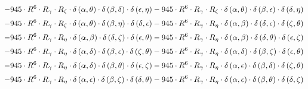 \begin{subequations}
\begin{gather}
 \\[0.2em] \notag 		 - 945 \cdot R^{6} \cdot R_{\gamma{}} \cdot R_{\zeta{}} \cdot \delta{}\left(\alpha{}, \theta{}\right) \cdot \delta{}\left(\beta{}, \delta{}\right) \cdot \delta{}\left(\epsilon{}, \eta{}\right)- 945 \cdot R^{6} \cdot R_{\gamma{}} \cdot R_{\zeta{}} \cdot \delta{}\left(\alpha{}, \theta{}\right) \cdot \delta{}\left(\beta{}, \epsilon{}\right) \cdot \delta{}\left(\delta{}, \eta{}\right) 
 \\[0.2em] \notag 		 - 945 \cdot R^{6} \cdot R_{\gamma{}} \cdot R_{\zeta{}} \cdot \delta{}\left(\alpha{}, \theta{}\right) \cdot \delta{}\left(\beta{}, \eta{}\right) \cdot \delta{}\left(\delta{}, \epsilon{}\right)- 945 \cdot R^{6} \cdot R_{\gamma{}} \cdot R_{\eta{}} \cdot \delta{}\left(\alpha{}, \beta{}\right) \cdot \delta{}\left(\delta{}, \epsilon{}\right) \cdot \delta{}\left(\zeta{}, \theta{}\right) 
 \\[0.2em] \notag 		 - 945 \cdot R^{6} \cdot R_{\gamma{}} \cdot R_{\eta{}} \cdot \delta{}\left(\alpha{}, \beta{}\right) \cdot \delta{}\left(\delta{}, \zeta{}\right) \cdot \delta{}\left(\epsilon{}, \theta{}\right)- 945 \cdot R^{6} \cdot R_{\gamma{}} \cdot R_{\eta{}} \cdot \delta{}\left(\alpha{}, \beta{}\right) \cdot \delta{}\left(\delta{}, \theta{}\right) \cdot \delta{}\left(\epsilon{}, \zeta{}\right) 
 \\[0.2em] \notag 		 - 945 \cdot R^{6} \cdot R_{\gamma{}} \cdot R_{\eta{}} \cdot \delta{}\left(\alpha{}, \delta{}\right) \cdot \delta{}\left(\beta{}, \epsilon{}\right) \cdot \delta{}\left(\zeta{}, \theta{}\right)- 945 \cdot R^{6} \cdot R_{\gamma{}} \cdot R_{\eta{}} \cdot \delta{}\left(\alpha{}, \delta{}\right) \cdot \delta{}\left(\beta{}, \zeta{}\right) \cdot \delta{}\left(\epsilon{}, \theta{}\right) 
 \\[0.2em] \notag 		 - 945 \cdot R^{6} \cdot R_{\gamma{}} \cdot R_{\eta{}} \cdot \delta{}\left(\alpha{}, \delta{}\right) \cdot \delta{}\left(\beta{}, \theta{}\right) \cdot \delta{}\left(\epsilon{}, \zeta{}\right)- 945 \cdot R^{6} \cdot R_{\gamma{}} \cdot R_{\eta{}} \cdot \delta{}\left(\alpha{}, \epsilon{}\right) \cdot \delta{}\left(\beta{}, \delta{}\right) \cdot \delta{}\left(\zeta{}, \theta{}\right) 
 \\[0.2em] \notag 		 - 945 \cdot R^{6} \cdot R_{\gamma{}} \cdot R_{\eta{}} \cdot \delta{}\left(\alpha{}, \epsilon{}\right) \cdot \delta{}\left(\beta{}, \zeta{}\right) \cdot \delta{}\left(\delta{}, \theta{}\right)- 945 \cdot R^{6} \cdot R_{\gamma{}} \cdot R_{\eta{}} \cdot \delta{}\left(\alpha{}, \epsilon{}\right) \cdot \delta{}\left(\beta{}, \theta{}\right) \cdot \delta{}\left(\delta{}, \zeta{}\right) 

\end{gather}
\end{subequations}
